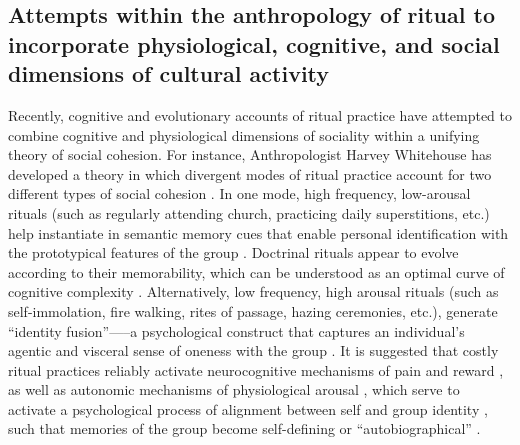 \begin{CJK}{UTF8}{gbsn}



\subsection{Attempts within the anthropology of ritual to incorporate physiological, cognitive, and social dimensions of cultural activity}

Recently, cognitive and evolutionary accounts of ritual practice have attempted to combine cognitive and physiological dimensions of sociality within a unifying theory of social cohesion.  For instance, Anthropologist Harvey Whitehouse has developed a theory in which divergent modes of ritual practice account for two different types of social cohesion \citep[commonly known as the ``modes theory''][]{Whitehouse1996,Whitehouse2004,Whitehouse2014}.  In one mode, high frequency, low-arousal rituals (such as regularly attending church, practicing daily superstitions, etc.) help instantiate in semantic memory cues that enable personal identification with the prototypical features of the group \cite[i.e., ``group identification,'' cf.][]{Turner1987}.  Doctrinal rituals appear to evolve according to their memorability, which can be understood as an optimal curve of cognitive complexity \citep[][]{Whitehouse2005,Kapitany2015}.  Alternatively, low frequency, high arousal rituals (such as self-immolation, fire walking, rites of passage, hazing ceremonies, etc.), generate ``identity fusion''—--a psychological construct that captures an individual’s agentic and visceral sense of oneness with the group \citep{Swann2009,Swann2015}.  It is suggested that costly ritual practices reliably activate neurocognitive mechanisms of pain and reward \citep{Fischer2014a}, as well as autonomic mechanisms of physiological arousal \citep{Swann2010,Jackson2018}, which serve to activate a psychological process of alignment between self and group identity \citep{Xygalatas2013}, such that memories of the group become self-defining or ``autobiographical'' \citep[see][]{Whitehouse2014}.


\end{CJK}
